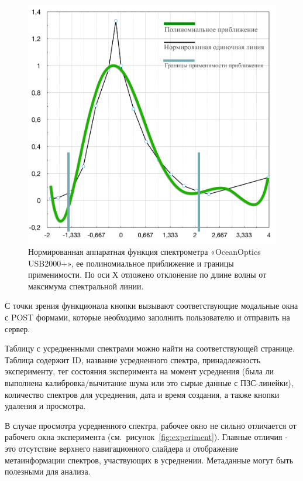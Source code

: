 \begin{figure}[t]
  \centering
  \includegraphics[width=13cm]{figures/hardware_function}
  \caption{Нормированная аппаратная функция спектрометра «OceanOptics USB2000+», ее полиномиальное приближение и границы применимости.
  По оси Х отложено отклонение по длине волны от максимума спектральной линии.
   }
  \label{fig:hardware_function}
\end{figure}

С точки зрения функционала кнопки вызывают соответствующие модальные окна с POST формами, которые необходимо заполнить
пользователю и отправить на сервер.

Таблицу с усредненными спектрами можно найти на соответствующей странице. Таблица содержит ID, название усредненного
спектра, принадлежность эксперименту, тег состояния эксперимента на момент усреднения
(была ли выполнена калибровка/вычитание шума или это сырые данные с ПЗС-линейки), количество спектров для усреднения,
дата и время создания, а также кнопки удаления и просмотра.

В случае просмотра усредненного спектра, рабочее окно не сильно отличается от рабочего окна эксперимента (см.~рисунок~\ref{fig:experiment}).
Главные отличия - это отсутствие верхнего навигационного слайдера и отображение метаинформации спектров, участвующих
в усреднении. Метаданные могут быть полезными для анализа.

